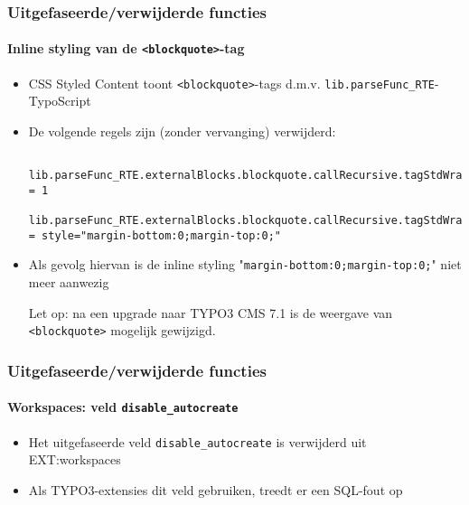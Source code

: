 \begin{frame}[fragile]
	\frametitle{Uitgefaseerde/verwijderde functies}
	\framesubtitle{Inline styling van de \texttt{<blockquote>}-tag}

	\lstset{basicstyle=\tiny\ttfamily}

	\begin{itemize}

		\item CSS Styled Content toont \texttt{<blockquote>}-tags d.m.v. \texttt{lib.parseFunc\_RTE}-TypoScript
		\item De volgende regels zijn (zonder vervanging) verwijderd:

			\begin{lstlisting}
				lib.parseFunc_RTE.externalBlocks.blockquote.callRecursive.tagStdWrap.HTMLparser = 1
				lib.parseFunc_RTE.externalBlocks.blockquote.callRecursive.tagStdWrap.HTMLparser.tags.blockquote.overrideAttribs = style="margin-bottom:0;margin-top:0;"
			\end{lstlisting}

		\item Als gevolg hiervan is de inline styling "\texttt{margin-bottom:0;margin-top:0;}" niet meer aanwezig

			\vspace{0.2cm}

			\begingroup
				\color{red}
					Let op: na een upgrade naar TYPO3 CMS 7.1 is de weergave van \texttt{<blockquote>} mogelijk gewijzigd.
			\endgroup

	\end{itemize}

\end{frame}


\begin{frame}[fragile]
	\frametitle{Uitgefaseerde/verwijderde functies}
	\framesubtitle{Workspaces: veld \texttt{disable\_autocreate}}

	\begin{itemize}
		\item Het uitgefaseerde veld \texttt{disable\_autocreate} is verwijderd uit EXT:workspaces
		\item Als TYPO3-extensies dit veld gebruiken, treedt er een SQL-fout op
	\end{itemize}

\end{frame}

